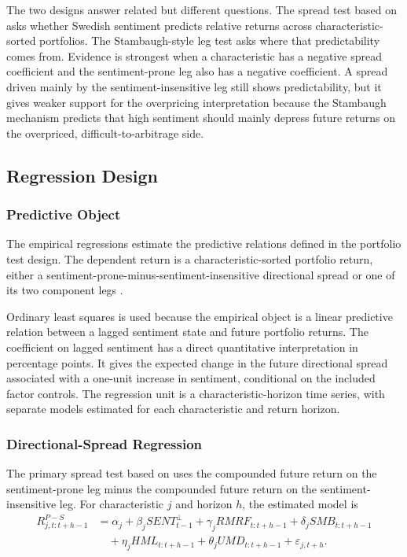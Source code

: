 \documentclass[11pt]{article}
\newcommand{\var}[1]{\ensuremath{#1}}
\begin{document}
The two designs answer related but different questions. The spread test based on \citet{baker2006sentiment} asks whether Swedish sentiment predicts relative returns across characteristic-sorted portfolios. The Stambaugh-style leg test asks where that predictability comes from. Evidence is strongest when a characteristic has a negative spread coefficient and the sentiment-prone leg also has a negative coefficient. A spread driven mainly by the sentiment-insensitive leg still shows predictability, but it gives weaker support for the overpricing interpretation because the Stambaugh mechanism predicts that high sentiment should mainly depress future returns on the overpriced, difficult-to-arbitrage side.

\subsection{Regression Design}
\subsubsection{Predictive Object}
The empirical regressions estimate the predictive relations defined in the portfolio test design. The dependent return is a characteristic-sorted portfolio return, either a sentiment-prone-minus-sentiment-insensitive directional spread or one of its two component legs \citep{baker2006sentiment,li2026ecinreplication}.

Ordinary least squares is used because the empirical object is a linear predictive relation between a lagged sentiment state and future portfolio returns. The coefficient on lagged sentiment has a direct quantitative interpretation in percentage points. It gives the expected change in the future directional spread associated with a one-unit increase in sentiment, conditional on the included factor controls. The regression unit is a characteristic-horizon time series, with separate models estimated for each characteristic and return horizon.

\subsubsection{Directional-Spread Regression}
The primary spread test based on \citet{baker2006sentiment} uses the compounded future return on the sentiment-prone leg minus the compounded future return on the sentiment-insensitive leg. For characteristic \var{j} and horizon \var{h}, the estimated model is
\begin{equation}
    \begin{aligned}
    R^{P-S}_{j,t:t+h-1}
    &=
    \alpha_j
    + \beta_j SENT^{\perp}_{t-1}
    + \gamma_j RMRF_{t:t+h-1}
    + \delta_j SMB_{t:t+h-1} \\
    &\quad
    + \eta_j HML_{t:t+h-1}
    + \theta_j UMD_{t:t+h-1}
    + \varepsilon_{j,t+h}.
    \end{aligned}
\end{equation}
\end{document}
